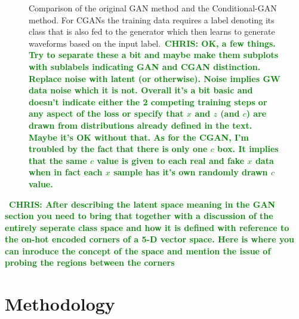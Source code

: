 \documentclass[12pt]{iopart}
\newcommand{\chris}[1]{\textbf{\textcolor{green}{CHRIS: #1}}}
\begin{document}
\begin{figure}
    \centering
    \caption{Comparison of the original GAN method and the
Conditional-GAN method. For CGANs the training data requires a label denoting
its class that is also fed to the generator which then learns to generate
waveforms based on the input label.~\chris{OK, a few things. Try to separate
these a bit and maybe make them subplots with sublabels indicating GAN and CGAN
distinction. Replace noise with latent (or otherwise). Noise implies GW data
noise which it is not. Overall it's a bit basic and doesn't indicate either the
2 competing training steps or any aspect of the loss or specify that $x$ and
$z$ (and $c$) are drawn from distributions already defined in the text. Maybe it's OK without
that. As for the CGAN, I'm troubled by the fact that there is only one $c$ box.
It implies that the same $c$ value is given to each real and fake $x$ data when
in fact each $x$ sample has it's own randomly drawn $c$ value.}} \label{fig:gan_comparison}
\end{figure}

~\chris{After describing the latent space meaning in the GAN section you need
to bring that together with a discussion of the entirely seperate class space
and how it is defined with reference to the on-hot encoded corners of a 5-D
vector space. Here is where you can inroduce the concept of the space and
mention the issue of probing the regions between the corners}

\section{Methodology}

\end{document}
